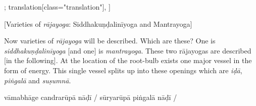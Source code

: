 \documentclass[12pt]{article}%
\def\om{\textrm{\foreignlanguage{english}{\footnotesize omitted in\ }}} %
\begin{document}
\begin{alignment}[
    texts=edition[class="edition"];
    translation[class="translation"],
  ]
\begin{translation}
        \bigskip
    \centerline{\textrm{\small{[Varieties of \textit{rājayoga}: Siddhakuṇḍalinīyoga and Mantrayoga]}}}
    \bigskip
    \begin{tlate}Now varieties of \textit{rājayoga} will be described. Which are these? One is \textit{siddhakuṇḍalinīyoga} [and one] is \textit{mantrayoga}. These two rājayogas are described [in the following]. At the location of the root-bulb exists one major vessel in the form of energy. This single vessel splits up into these openings which are \textit{iḍā}, \textit{piṅgalā} and \textit{suṣumnā}. \end{tlate}
    \end{translation}
    \begin{edition}
      \begin{prose}
        vāmabhāge candrarūpā
         nāḍī
        /
        sūryarūpā piṅgalā nāḍī
        /

\end{prose}
\end{edition}
\end{alignment}
\end{document}
